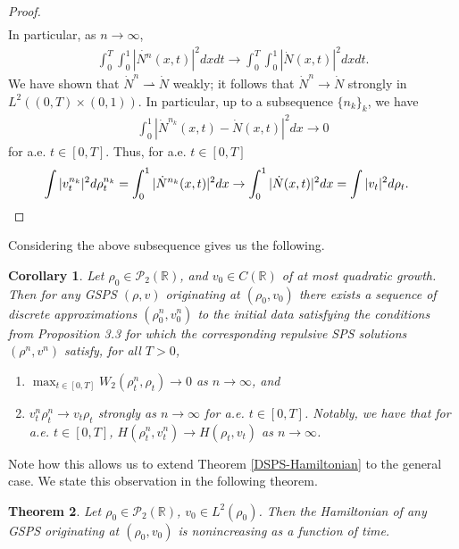 \documentclass[11pt]{article}
\newtheorem{theorem}{Theorem}[section]
\newtheorem{corollary}[theorem]{Corollary}
\numberwithin{equation}{section}
\begin{document}
\begin{proof}
\begin{align*}
            \end{align*}
            In particular, as $n\to\infty$,
            \begin{align*}
                \int_0^T \!\! \int_0^1|\dot{N^n}(x,t)|^2dxdt\to\int_0^T \!\! \int_0^1|\dot{N}(x,t)|^2dxdt. 
            \end{align*}
            We have shown that $\dot{N}^n\rightharpoonup\dot{N}$ weakly; it follows that $\dot{N}^n\to\dot{N}$ strongly in $L^2((0,T)\times(0,1))$. In particular, up to a subsequence $\{n_k\}_k$, we have 
            \begin{align*}
                \int_0^1|\dot{N}^{n_k}(x,t)-\dot{N}(x,t)|^2dx\to0
            \end{align*}
            for a.e. $t\in[0,T]$. Thus, for a.e. $t\in[0,T]$
            \begin{align*}
                \int|v_t^{n_k}|^2d\rho_t^{n_k}&=\int_0^1|\dot{N}^{n_k}(x,t)|^2dx\to\int_0^1|\dot{N}(x,t)|^2dx=\int|v_t|^2d\rho_t. \qedhere
            \end{align*}
        \end{proof}
        Considering the above subsequence gives us the following. 
        \begin{corollary}\label{existence-general}
            Let $\rho_0\in\mathcal{P}_2(\mathbb{R})$, and $v_0\in C(\mathbb{R})$ of at most quadratic growth. Then for any GSPS $(\rho,v)$ originating at $(\rho_0,v_0)$ there exists a sequence of discrete approximations $(\rho_0^n,v_0^n)$ to the initial data satisfying the conditions from Proposition 3.3 \cite{Tudorascu-2008} for which the corresponding repulsive SPS solutions $(\rho^n,v^n)$ satisfy, for all $T>0$, 
            \begin{enumerate}[label={(\arabic*)}]
                \item$\max_{t\in[0,T]}W_2(\rho_t^n,\rho_t)\to0$ as $n\to\infty$, and 
                \item $v_t^n\rho_t^n\to v_t\rho_t$ strongly as $n\to\infty$ for a.e. $t\in[0,T]$. Notably, we have that for a.e. $t\in[0,T]$, $H(\rho_t^n,v_t^n)\to H(\rho_t,v_t)$ as $n\to\infty$. 
            \end{enumerate}
        \end{corollary}
        Note how this allows us to extend Theorem \ref{DSPS-Hamiltonian} to the general case. We state this observation in the following theorem. 
        \begin{theorem}\label{GSPS-Hamiltonian}
            Let $\rho_0\in\mathcal{P}_2(\mathbb{R})$, $v_0\in L^2(\rho_0)$. Then the Hamiltonian of any GSPS originating at $(\rho_0,v_0)$ is nonincreasing as a function of time. 
        \end{theorem}
\end{document}
